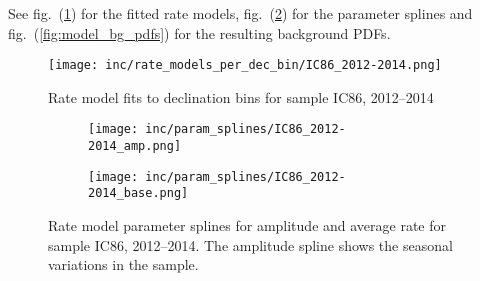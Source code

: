 See fig.~(\ref{fig:dec_bin_rate_models}) for the fitted rate models, fig.~(\ref{fig:param_splines}) for the parameter splines and fig.~(\ref{fig:model_bg_pdfs}) for the resulting background PDFs.

\begin{figure}[h]
  \centering
  \texttt{[image: inc/rate\_models\_per\_dec\_bin/IC86\_2012-2014.png]}
  \caption{Rate model fits to declination bins for sample IC86, 2012–2014}
  \label{fig:dec_bin_rate_models}
\end{figure}

\begin{figure}[h]
  \centering
  \begin{subfigure}[c]{0.49\textwidth}
    \texttt{[image: inc/param\_splines/IC86\_2012-2014\_amp.png]}
  \end{subfigure}
  \hfill
  \begin{subfigure}[c]{0.49\textwidth}
    \texttt{[image: inc/param\_splines/IC86\_2012-2014\_base.png]}
  \end{subfigure}
  \caption{Rate model parameter splines for amplitude and average rate for sample IC86, 2012–2014. The amplitude spline shows the seasonal variations in the sample.}
  \label{fig:param_splines}
\end{figure}

